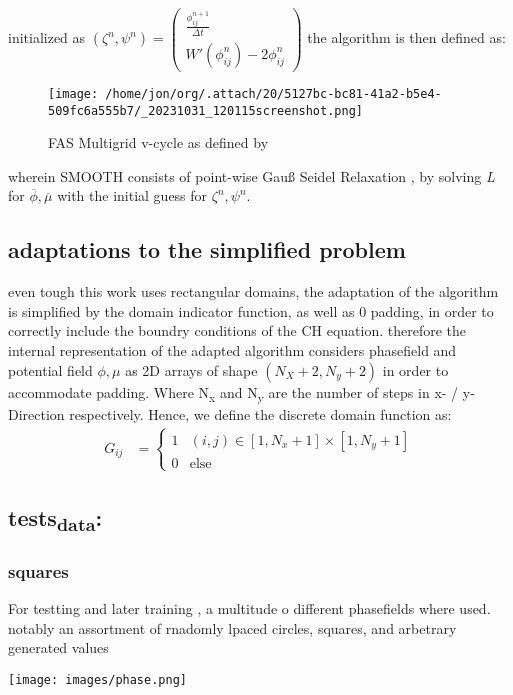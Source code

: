 \documentclass[11pt]{article}
\begin{document}
initialized as
\((\zeta^n, \psi^n) =
\left(\begin{smallmatrix}
\frac{\phi_{ij}^{n+1}}{\Delta t}\\
W'(\phi_{ij}^n) - 2\phi_{ij}^n
\end{smallmatrix}
\right)\)
the algorithm is then defined as:
\begin{figure}[htbp]
\centering
\texttt{[image: /home/jon/org/.attach/20/5127bc-bc81-41a2-b5e4-509fc6a555b7/\_20231031\_120115screenshot.png]}
\caption{FAS Multigrid v-cycle as defined  by \autocite{SHIN20117441}}
\end{figure}

wherein SMOOTH consists of point-wise Gauß Seidel Relaxation , by solving \emph{L} for \(\overline{\phi} ,\overline{\mu}\) with the initial guess for \(\zeta^n , \psi^n\).
\subsection{adaptations to the simplified problem}
\label{sec:orgced1ab6}
even tough this work uses rectangular domains, the adaptation of the algorithm is simplified by the domain indicator function, as well as 0 padding, in order to correctly include the boundry conditions of the CH equation.
therefore the internal representation of the adapted algorithm considers phasefield and potential field \(\phi , \mu\) as 2D arrays of shape \((N_X + 2 , N_y + 2)\) in order to accommodate padding. Where N\textsubscript{x} and N\textsubscript{y} are the number of steps in x- / y-Direction respectively.
Hence, we define the discrete domain function as:
\begin{align*}
G_{ij} &=
\begin{cases}
1 & (i,j) \in  [1,N_x+1] \times  [1,N_y+1] \\
0 & \text{else}
\end{cases}
\end{align*}
\subsection{tests\textsubscript{data}:}
\label{sec:org6ae2435}
\subsubsection{squares}
\label{sec:org72ed7e5}
For testting and later training , a multitude o different phasefields where used. notably an assortment of rnadomly lpaced circles, squares, and arbetrary generated values
\begin{center}
\texttt{[image: images/phase.png]}
\end{center}
\end{document}
